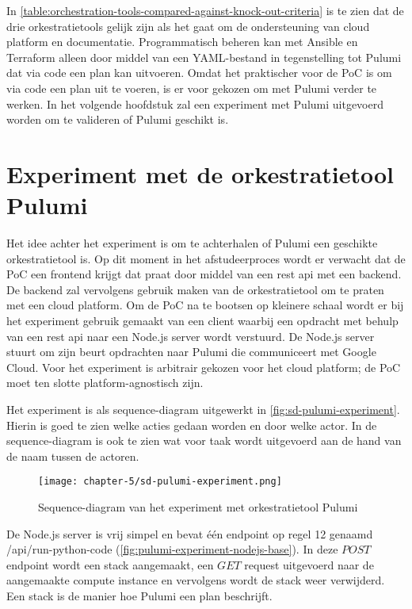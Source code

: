 In \autoref{table:orchestration-tools-compared-against-knock-out-criteria} is te zien dat de drie orkestratietools gelijk zijn als het gaat om de ondersteuning van cloud platform en documentatie. Programmatisch beheren kan met Ansible en Terraform alleen door middel van een YAML-bestand in tegenstelling tot Pulumi dat via code een plan kan uitvoeren. Omdat het praktischer voor de PoC is om via code een plan uit te voeren, is er voor gekozen om met Pulumi verder te werken. In het volgende hoofdstuk zal een experiment met Pulumi uitgevoerd worden om te valideren of Pulumi geschikt is.

\section{Experiment met de orkestratietool Pulumi}\label{subsec:ch5-experiment-met-de-orkestratietool-pulumi}
Het idee achter het experiment is om te achterhalen of Pulumi een geschikte orkestratietool is. Op dit moment in het afstudeerproces wordt er verwacht dat de PoC een frontend krijgt dat praat door middel van een \acrfull{rest} \Acrshort{api} met een backend. De backend zal vervolgens gebruik maken van de orkestratietool om te praten met een cloud platform. Om de PoC na te bootsen op kleinere schaal wordt er bij het experiment gebruik gemaakt van een client waarbij een opdracht met behulp van een \Acrshort{rest} \Acrshort{api} naar een Node.js server wordt verstuurd. De Node.js server stuurt om zijn beurt opdrachten naar Pulumi die communiceert met Google Cloud. Voor het experiment is arbitrair gekozen voor het cloud platform; de PoC moet ten slotte platform-agnostisch zijn.

Het experiment is als sequence-diagram uitgewerkt in \autoref{fig:sd-pulumi-experiment}. Hierin is goed te zien welke acties gedaan worden en door welke actor. In de sequence-diagram is ook te zien wat voor taak wordt uitgevoerd aan de hand van de naam tussen de actoren.

\begin{figure}[hbt!]
  \centering
  \texttt{[image: chapter-5/sd-pulumi-experiment.png]}
  \caption{Sequence-diagram van het experiment met orkestratietool Pulumi}
  \label{fig:sd-pulumi-experiment}
\end{figure}

\newpage

De Node.js server is vrij simpel en bevat één endpoint op regel 12 genaamd /api/run-python-code (\autoref{fig:pulumi-experiment-nodejs-base}). In deze \(POST\) endpoint wordt een stack aangemaakt, een \(GET\) request uitgevoerd naar de aangemaakte compute instance en vervolgens wordt de stack weer verwijderd. Een stack is de manier hoe Pulumi een plan beschrijft.

